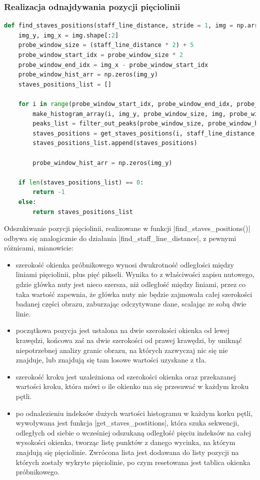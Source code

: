 \subsubsection{Realizacja odnajdywania pozycji pięciolinii}

\begin{lstlisting}[caption={\pyth|find_staves_positions()| - funkcja odnajdywania pozycji pięciolinii.}, label={find-staves-positions}, language=Python]
def find_staves_positions(staff_line_distance, stride = 1, img = np.array):
	img_y, img_x = img.shape[:2]
	probe_window_size = (staff_line_distance * 2) + 5
	probe_window_start_idx = probe_window_size * 2
	probe_window_end_idx = img_x - probe_window_start_idx
	probe_window_hist_arr = np.zeros(img_y)
	staves_positions_list = []
	
	for i in range(probe_window_start_idx, probe_window_end_idx, probe_window_size * stride):
		make_histogram_array(i, img_y, probe_window_size, img, probe_window_hist_arr)
		peaks_list = filter_out_peaks(probe_window_size, probe_window_hist_arr)
		staves_positions = get_staves_positions(i, staff_line_distance, peaks_list)
		staves_positions_list.append(staves_positions)
		
		probe_window_hist_arr = np.zeros(img_y)
	
	if len(staves_positions_list) == 0:
		return -1
	else:
		return staves_positions_list
\end{lstlisting}

Odszukiwanie pozycji pięciolinii, realizowane w funkcji \pyth|find_staves_positions()| odbywa się analogicznie do działania \pyth|find_staff_line_distance|, z pewnymi różnicami, mianowicie:
\begin{itemize}
	\item szerokość okienka próbnikowego wynosi dwukrotność odległości między liniami pięciolinii, plus pięć pikseli. Wynika to z właściwości zapisu nutowego, gdzie główka nuty jest nieco szersza, niż odległość między liniami, przez co taka wartość zapewnia, że główka nuty nie będzie zajmowała całej szerokości badanej części obrazu, zaburzając odczytywane dane, scalając ze sobą dwie linie.
	\item początkowa pozycja jest ustalona na dwie szerokości okienka od lewej krawędzi, końcowa zaś na dwie szerokości od prawej krawędzi, by uniknąć niepotrzebnej analizy granic obrazu, na których zazwyczaj nic się nie znajduje, lub znajdują się tam losowe wartości uzyskane z tła.
	\item szerokość kroku jest uzależniona od szerokości okienka oraz przekazanej wartości kroku, która mówi o ile okienko ma się przesuwać w każdym kroku pętli.
	\item po odnalezieniu indeksów dużych wartości histogramu w każdym korku pętli, wywoływana jest funkcja \pyth|get_staves_postitions|, która szuka sekwencji, odległych od siebie o wcześniej odszukaną odległość pięciu indeksów na całej wysokości okienka, tworząc listę punktów z danego wycinka, na którym znajdują się pięciolinie. Zwrócona lista jest dodawana do listy pozycji na których zostały wykryte pięciolinie, po czym resetowana jest tablica okienka próbnikowego.
\end{itemize}


